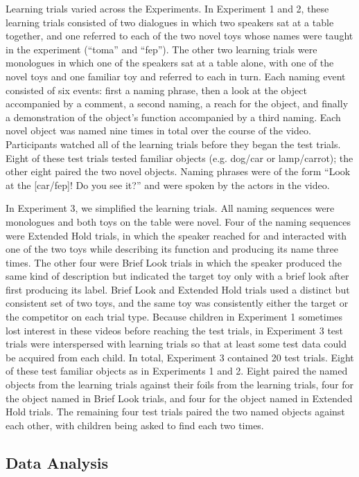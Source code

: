 \documentclass{pnastwo}
\begin{document}
\begin{article}
\begin{materials}
Learning trials varied across the Experiments. In Experiment 1 and 2, these learning trials consisted of two dialogues in which two speakers sat at a table together, and one referred to each of the two novel toys whose names were taught in the experiment (``toma'' and ``fep''). The other two learning trials were monologues in which one of the speakers sat at a table alone, with one of the novel toys and one familiar toy and referred to each in turn. Each naming event consisted of six events: first a naming phrase, then a look at the object accompanied by a comment, a second naming, a reach for the object, and finally a demonstration of the object's function accompanied by a third naming. Each novel object was named nine times in total over the course of the video. Participants watched all of the learning trials before they began the test trials. Eight of these test trials tested familiar objects (e.g. dog/car or lamp/carrot); the other eight paired the two novel objects. Naming phrases were of the form ``Look at the [car/fep]! Do you see it?'' and were spoken by the actors in the video.

In Experiment 3, we simplified the learning trials. All naming sequences were monologues and both toys on the table were novel.  Four of the naming sequences were Extended Hold trials, in which the speaker reached for and interacted with one of the two toys while describing its function and producing its name three times. The other four were Brief Look trials in which the speaker produced the same kind of description but indicated the target toy only with a brief look after first producing its label. Brief Look and Extended Hold trials used a distinct but consistent set of two toys, and the same toy was consistently either the target or the competitor on each trial type. Because children in Experiment 1 sometimes lost interest in these videos before reaching the test trials, in Experiment 3 test trials were interspersed with learning trials so that at least some test data could be acquired from each child. In total, Experiment 3 contained 20 test trials. Eight of these test familiar objects as in Experiments 1 and 2. Eight paired the named objects from the learning trials against their foils from the learning trials, four for the object named in Brief Look trials, and four for the object named in Extended Hold trials. The remaining four test trials paired the two named objects against each other, with children being asked to find each two times.

\subsection{Data Analysis}


\end{materials}
\end{article}
\end{document}
